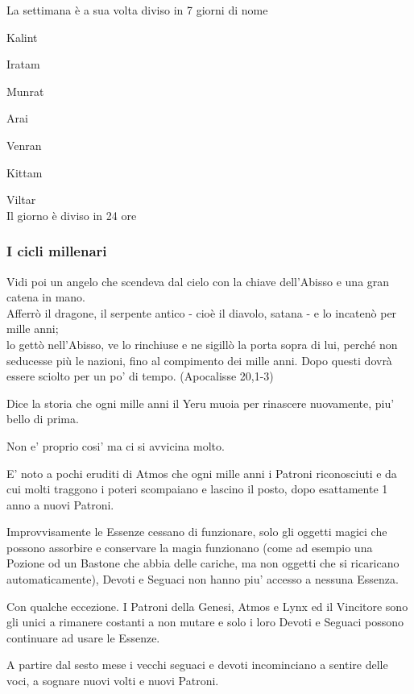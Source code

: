 \documentclass[a4paper,11pt,twoside,openany]{book}
\begin{document}
\bigskip
La settimana è a sua volta diviso in 7 giorni di nome

Kalint

Iratam

Munrat

Arai

Venran

Kittam

Viltar\\

Il giorno è diviso in 24 ore


\subsubsection{I cicli millenari}

\begin{tcolorbox}[enhanced,arc=5pt,boxrule=0.3pt]{
		Vidi poi un angelo che scendeva dal cielo con la chiave dell'Abisso e una gran catena in mano.\\
		Afferrò il dragone, il serpente antico - cioè il diavolo, satana - e lo incatenò per mille anni; \\
		lo gettò nell'Abisso, ve lo rinchiuse e ne sigillò la porta sopra di lui, perché non seducesse più le nazioni, fino al compimento dei mille anni. Dopo questi dovrà essere sciolto per un po' di tempo. (Apocalisse 20,1-3)
	}\end{tcolorbox}\medskip


Dice la storia che ogni mille anni il Yeru muoia per rinascere nuovamente, piu' bello di prima.

Non e' proprio cosi' ma ci si avvicina molto.

E' noto a pochi eruditi di Atmos che ogni mille anni i Patroni riconosciuti e da cui molti traggono i poteri scompaiano e lascino il posto, dopo esattamente 1 anno a nuovi Patroni.

Improvvisamente le Essenze cessano di funzionare, solo gli oggetti magici che possono assorbire e conservare la magia funzionano (come ad esempio una Pozione od un Bastone che abbia delle cariche, ma non oggetti che si ricaricano automaticamente), Devoti e Seguaci non hanno piu' accesso a nessuna Essenza.

Con qualche eccezione. I Patroni della Genesi, Atmos e Lynx  ed il Vincitore sono gli unici a rimanere costanti a non mutare e solo i loro Devoti e Seguaci possono continuare ad usare le Essenze.

A partire dal sesto mese i vecchi seguaci e devoti incominciano a sentire delle voci, a sognare nuovi volti e nuovi Patroni.
\end{document}
